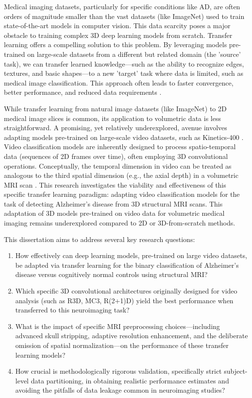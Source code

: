 \documentclass[11pt, a4paper]{article}
\begin{document}
Medical imaging datasets, particularly for specific conditions like AD, are often orders of magnitude smaller than the vast datasets (like ImageNet) used to train state-of-the-art models in computer vision. This data scarcity poses a major obstacle to training complex 3D deep learning models from scratch. Transfer learning offers a compelling solution to this problem. By leveraging models pre-trained on large-scale datasets from a different but related domain (the 'source' task), we can transfer learned knowledge—such as the ability to recognize edges, textures, and basic shapes—to a new 'target' task where data is limited, such as medical image classification. This approach often leads to faster convergence, better performance, and reduced data requirements \cite{maqsood2019transfer}.

While transfer learning from natural image datasets (like ImageNet) to 2D medical image slices is common, its application to volumetric data is less straightforward. A promising, yet relatively underexplored, avenue involves adapting models pre-trained on large-scale video datasets, such as Kinetics-400 \cite{tran2018closer}. Video classification models are inherently designed to process spatio-temporal data (sequences of 2D frames over time), often employing 3D convolutional operations. Conceptually, the temporal dimension in video can be treated as analogous to the third spatial dimension (e.g., the axial depth) in a volumetric MRI scan \cite{tran2018closer, wu20223d}. This research investigates the viability and effectiveness of this specific transfer learning paradigm: adapting video classification models for the task of detecting Alzheimer's disease from 3D structural MRI scans. This adaptation of 3D models pre-trained on video data for volumetric medical imaging remains underexplored compared to 2D or 3D-from-scratch methods.

This dissertation aims to address several key research questions:
\begin{enumerate}
    \item How effectively can deep learning models, pre-trained on large video datasets, be adapted via transfer learning for the binary classification of Alzheimer's disease versus cognitively normal controls using structural MRI?
    \item Which specific 3D convolutional architectures originally designed for video analysis (such as R3D, MC3, R(2+1)D) yield the best performance when transferred to this neuroimaging task?
    \item What is the impact of specific MRI preprocessing choices—including advanced skull stripping, adaptive resolution enhancement, and the deliberate omission of spatial normalization—on the performance of these transfer learning models?
    \item How crucial is methodologically rigorous validation, specifically strict subject-level data partitioning, in obtaining realistic performance estimates and avoiding the pitfalls of data leakage common in neuroimaging studies?
\end{enumerate}
\end{document}
